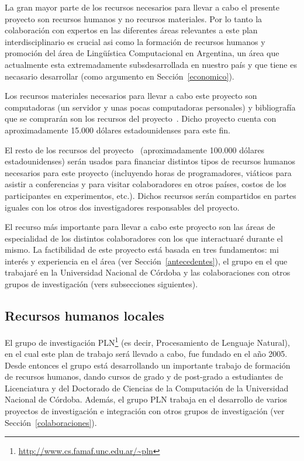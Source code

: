 \documentclass[11pt]{article}
\begin{document}
La gran mayor parte de los recursos necesarios para llevar a cabo el presente
proyecto son recursos humanos y no recursos materiales. Por lo tanto la
colaboraci\'on con expertos en las diferentes \'areas relevantes a este plan
interdisciplinario es crucial asi como la formaci\'on de recursos humanos y
promoci\'on del \'area de Ling\"u\'istica Computacional en Argentina, un \'area
que actualmente esta extremadamente subsdesarrollada en nuestro pa\'is y que
tiene es necasario desarrollar (como argumento en Secci\'on~\ref{economico}). 

Los recursos materiales necesarios para llevar a cabo este proyecto son
computadoras (un servidor y unas pocas computadoras personales) y
bibliograf\'ia que se comprar\'an son los recursos del
proyecto~\citep{areces10b}. Dicho proyecto cuenta con aproximadamente 15.000
d\'olares estadounidenses para este fin. 

El resto de los recursos del proyecto~\citep{areces10b} (aproximadamente 100.000
d\'olares estadounidenses) ser\'an usados para financiar distintos tipos de
recursos humanos necesarios para este proyecto (incluyendo horas de
programadores, vi\'aticos para asistir a conferencias y para visitar
colaboradores en otros pa\'ises, costos de los participantes en experimentos,
etc.). Dichos recursos ser\'an compartidos en partes iguales con los otros dos
investigadores responsables del proyecto. 

El recurso m\'as importante para llevar a cabo este proyecto son las \'areas de
especialidad de los distintos colaboradores con los que interactuar\'e durante
el mismo. La factibilidad de este
proyecto est\'a basada en tres fundamentos: mi inter\'es y experiencia en el
\'area (ver Secci\'on~\ref{antecedentes}), el grupo en el que trabajar\'e en la
Universidad Nacional de C\'ordoba y las colaboraciones con otros grupos de
investigaci\'on (vers subsecciones siguientes). 


\subsection{Recursos humanos locales}

El grupo de investigaci\'on
PLN\footnote{\url{http://www.cs.famaf.unc.edu.ar/~pln}} (es decir,
Procesamiento de Lenguaje Natural), en el cual este plan de trabajo ser\'a
llevado a cabo, fue fundado en el a\~no 2005. Desde entonces el grupo est\'a
desarrollando un importante trabajo de formaci\'on de recursos humanos, dando
cursos de grado y de post-grado a estudiantes de Licenciatura y del Doctorado de
Ciencias de la Computaci\'on de la Universidad Nacional de C\'ordoba. Adem\'as,
el grupo PLN trabaja en el desarrollo de varios proyectos de investigaci\'on e
integraci\'on con otros grupos de investigaci\'on (ver
Secci\'on~\ref{colaboraciones}). 
\end{document}
